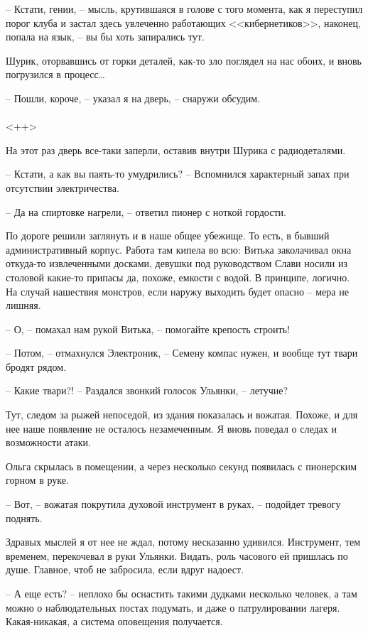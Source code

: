 \documentclass[a4paper]{book}
\begin{document}
-- Кстати, гении, -- мысль, крутившаяся в голове с того момента, как я переступил порог клуба и застал здесь увлеченно работающих <<кибернетиков>>, наконец, попала на язык, -- вы бы хоть запирались тут. 

Шурик, оторвавшись от горки деталей, как-то зло поглядел на нас обоих, и вновь погрузился в процесс\ldots

-- Пошли, короче, -- указал я на дверь, -- снаружи обсудим.

\paragraph{}<++>

На этот раз дверь все-таки заперли, оставив внутри Шурика с радиодеталями. 

-- Кстати, а как вы паять-то умудрились? -- Вспомнился характерный запах при отсутствии электричества. 

-- Да на спиртовке нагрели, -- ответил пионер с ноткой гордости.

По дороге решили заглянуть и в наше общее убежище. То есть, в бывший административный корпус. Работа там кипела во всю: Витька заколачивал окна откуда-то  извлеченными досками, девушки под руководством Слави носили из столовой какие-то припасы да, похоже, емкости с водой. В принципе, логично. На случай нашествия монстров, если наружу выходить будет опасно -- мера не лишняя.

-- О, -- помахал нам рукой Витька, -- помогайте крепость строить!

-- Потом, -- отмахнулся Электроник, -- Семену компас нужен, и вообще тут твари бродят рядом.

-- Какие твари?! -- Раздался звонкий голосок Ульянки, -- летучие?

Тут, следом за рыжей непоседой, из здания показалась и вожатая. Похоже, и для нее наше появление не осталось незамеченным. Я вновь поведал о следах и возможности атаки. 

Ольга скрылась в помещении, а через несколько секунд появилась с пионерским горном в руке. 

-- Вот, -- вожатая покрутила духовой инструмент в руках, -- подойдет тревогу поднять. 

Здравых мыслей я от нее не ждал, потому несказанно удивился. Инструмент, тем временем, перекочевал в руки Ульянки. Видать, роль часового ей пришлась по душе. Главное, чтоб не забросила, если вдруг надоест. 

-- А еще есть? -- неплохо бы оснастить такими дудками несколько человек, а там можно о наблюдательных постах подумать, и даже о патрулировании лагеря. Какая-никакая, а система оповещения получается.
\end{document}
